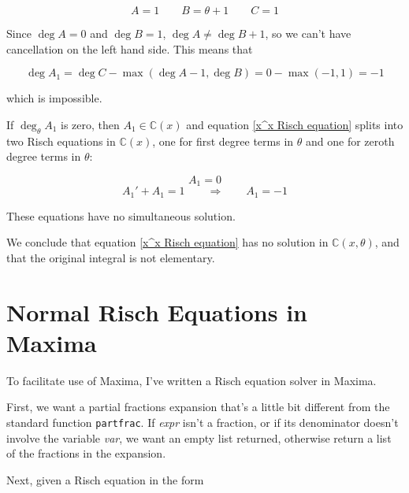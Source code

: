 $$A=1 \qquad B=\theta +1 \qquad C=1$$

Since $\deg A = 0$ and $\deg B=1$, $\deg A \ne \deg B + 1$,
so we can't have cancellation on the left hand side.
This means that

$$\deg A_1 = \deg C - \max(\deg A - 1, \deg B) = 0 - \max(-1, 1) = -1$$

which is impossible.

If $\deg_\theta A_1$ is zero,
then $A_1 \in {\mathbb C}(x)$ and equation
\eqref{x^x Risch equation}
splits into two Risch equations in ${\mathbb C}(x)$,
one for first degree
terms in $\theta$ and one for zeroth degree
terms in $\theta$:

$$A_1 = 0$$
$$A_1' + A_1 = 1 \qquad\Longrightarrow\qquad A_1 = -1$$

These equations have no simultaneous solution.

We conclude that equation \eqref{x^x Risch equation} has no solution
in ${\mathbb C}(x, \theta)$, and that the original integral
is not elementary.

\endexample

\vfill\eject
\section{Normal Risch Equations in Maxima}

To facilitate use of Maxima, I've written a Risch equation
solver in Maxima.

First, we want a partial fractions expansion that's a little bit
different from the standard function {\tt partfrac}.  If {\it expr}
isn't a fraction, or if its denominator doesn't involve the variable
{\it var}, we want an empty list returned, otherwise return a list of
the fractions in the expansion.


Next, given a Risch equation in the form

